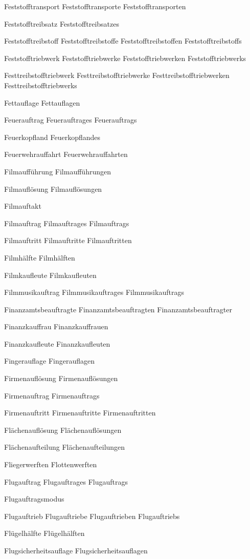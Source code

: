 Feststofftransport
Feststofftransporte
Feststofftransporten

Feststofftreibsatz
Feststofftreibsatzes

Feststofftreibstoff
Feststofftreibstoffe
Feststofftreibstoffen
Feststofftreibstoffs

Feststofftriebwerk
Feststofftriebwerke
Feststofftriebwerken
Feststofftriebwerks

Festtreibstofftriebwerk
Festtreibstofftriebwerke
Festtreibstofftriebwerken
Festtreibstofftriebwerks

Fettauflage
Fettauflagen

Feuerauftrag
Feuerauftrages
Feuerauftrags

Feuerkopfland
Feuerkopflandes

Feuerwehrauffahrt
Feuerwehrauffahrten

Filmaufführung
Filmaufführungen

Filmauflösung
Filmauflösungen

Filmauftakt

Filmauftrag
Filmauftrages
Filmauftrags

Filmauftritt
Filmauftritte
Filmauftritten

Filmhälfte
Filmhälften

Filmkaufleute
Filmkaufleuten

Filmmusikauftrag
Filmmusikauftrages
Filmmusikauftrags

Finanzamtsbeauftragte
Finanzamtsbeauftragten
Finanzamtsbeauftragter

Finanzkauffrau
Finanzkauffrauen

Finanzkaufleute
Finanzkaufleuten

Fingerauflage
Fingerauflagen

Firmenauflösung
Firmenauflösungen

Firmenauftrag
Firmenauftrags

Firmenauftritt
Firmenauftritte
Firmenauftritten

Flächenauflösung
Flächenauflösungen

Flächenaufteilung
Flächenaufteilungen

Fliegerwerften
Flottenwerften

Flugauftrag
Flugauftrages
Flugauftrags

Flugauftragsmodus

Flugauftrieb
Flugauftriebe
Flugauftrieben
Flugauftriebs

Flügelhälfte
Flügelhälften

Flugsicherheitsauflage
Flugsicherheitsauflagen

